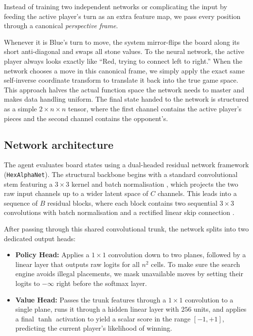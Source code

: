 \documentclass[conference]{IEEEtran}
\begin{document}
Instead of training two independent networks or complicating the input by feeding the active player's turn as an extra feature map, we pass every position through a canonical \emph{perspective frame}.

Whenever it is Blue's turn to move, the system mirror-flips the board along its short anti-diagonal and swaps all stone values. To the neural network, the active player always looks exactly like ``Red, trying to connect left to right.'' When the network chooses a move in this canonical frame, we simply apply the exact same self-inverse coordinate transform to translate it back into the true game space. This approach halves the actual function space the network needs to master and makes data handling uniform. The final state handed to the network is structured as a simple $2\times n\times n$ tensor, where the first channel contains the active player's pieces and the second channel contains the opponent's.

\subsection{Network architecture}
The agent evaluates board states using a dual-headed residual network framework (\texttt{HexAlphaNet}). The structural backbone begins with a standard convolutional stem featuring a $3\times3$ kernel and batch normalisation \cite{ioffe2015batch}, which projects the two raw input channels up to a wider latent space of $C$ channels. This leads into a sequence of $B$ residual blocks, where each block contains two sequential $3\times3$ convolutions with batch normalisation and a rectified linear skip connection \cite{he2016deep}.

After passing through this shared convolutional trunk, the network splits into two dedicated output heads:
\begin{itemize}
  \item \textbf{Policy Head:} Applies a $1\times1$ convolution down to two planes, followed by a linear layer that outputs raw logits for all $n^2$ cells. To make sure the search engine avoids illegal placements, we mask unavailable moves by setting their logits to $-\infty$ right before the softmax layer.
  \item \textbf{Value Head:} Passes the trunk features through a $1\times1$ convolution to a single plane, runs it through a hidden linear layer with $256$ units, and applies a final $\tanh$ activation to yield a scalar score in the range $[-1, +1]$, predicting the current player's likelihood of winning.
\end{itemize}
\end{document}
